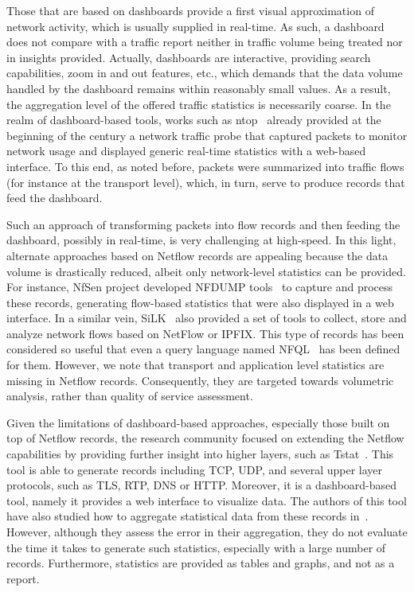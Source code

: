 \documentclass[AMA,STIX1COL]{WileyNJD-v2}
\begin{document}
Those that are based on dashboards provide a first visual approximation of network activity, which is usually supplied in real-time. As such, a dashboard does not compare with a traffic report neither in traffic volume being treated nor in insights provided. Actually, dashboards are  interactive, providing search capabilities, zoom in and out features, etc., which demands that the data volume handled by the dashboard remains within reasonably small values. As a result, the aggregation level of the offered traffic statistics is necessarily coarse. In the realm of dashboard-based tools, works such as \textsf{ntop}~\cite{ntop} already provided at the beginning of the century a network traffic probe that captured packets to monitor network usage and displayed generic real-time statistics with a web-based interface. To this end, as noted before, packets were summarized into traffic flows (for instance at the transport level), which, in turn, serve to produce records that feed the dashboard.

Such an approach of transforming packets into flow records and then feeding the dashboard, possibly in real-time, is very challenging at high-speed. In this light, alternate approaches based on Netflow records are appealing because the data volume is drastically reduced, albeit only network-level statistics can be provided. For instance, NfSen project developed \textsf{NFDUMP} tools~\cite{nfdump} to capture and process these records, generating flow-based statistics that were also displayed in a web interface. In a similar vein, \textsf{SiLK}~\cite{silk} also provided a set of tools to collect, store and analyze network flows based on NetFlow or IPFIX. This type of records has been considered so useful that even a query language named NFQL~\cite{nfql} has been defined for them. However, we note that transport and application level statistics are missing in Netflow records. Consequently, they are targeted towards volumetric analysis, rather than quality of service assessment.  %

Given the limitations of dashboard-based approaches, especially those built on top of Netflow records, the research community focused on extending the Netflow capabilities by providing further insight into higher layers, such as \textsf{Tstat}~\cite{tstat}. This tool is able to generate records including TCP, UDP, and several upper layer protocols, such as TLS, RTP, DNS or HTTP. Moreover, it is a dashboard-based tool, namely it provides a web interface to visualize data. The authors of this tool have also studied how to aggregate statistical data from these records in~\cite{tstat_stats}. However, although they assess the error in their aggregation, they do not evaluate the time it takes to generate such statistics, especially with a large number of records. Furthermore, statistics are provided as tables and graphs, and not as a report.
\end{document}
